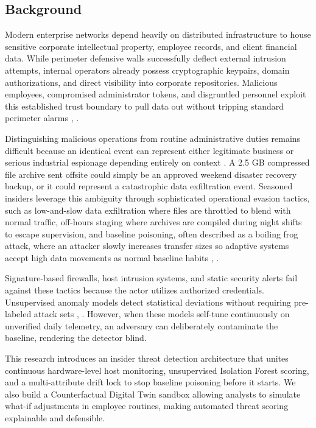 \documentclass[conference]{IEEEtran}
\begin{document}
\subsection{Background}
Modern enterprise networks depend heavily on distributed infrastructure to house sensitive corporate intellectual property, employee records, and client financial data. While perimeter defensive walls successfully deflect external intrusion attempts, internal operators already possess cryptographic keypairs, domain authorizations, and direct visibility into corporate repositories. Malicious employees, compromised administrator tokens, and disgruntled personnel exploit this established trust boundary to pull data out without tripping standard perimeter alarms \cite{b1}, \cite{b2}.

Distinguishing malicious operations from routine administrative duties remains difficult because an identical event can represent either legitimate business or serious industrial espionage depending entirely on context \cite{b3}. A 2.5 GB compressed file archive sent offsite could simply be an approved weekend disaster recovery backup, or it could represent a catastrophic data exfiltration event. Seasoned insiders leverage this ambiguity through sophisticated operational evasion tactics, such as low-and-slow data exfiltration where files are throttled to blend with normal traffic, off-hours staging where archives are compiled during night shifts to escape supervision, and baseline poisoning, often described as a boiling frog attack, where an attacker slowly increases transfer sizes so adaptive systems accept high data movements as normal baseline habits \cite{b4}, \cite{b5}.

Signature-based firewalls, host intrusion systems, and static security alerts fail against these tactics because the actor utilizes authorized credentials. Unsupervised anomaly models detect statistical deviations without requiring pre-labeled attack sets \cite{b6}, \cite{b7}. However, when these models self-tune continuously on unverified daily telemetry, an adversary can deliberately contaminate the baseline, rendering the detector blind.

This research introduces an insider threat detection architecture that unites continuous hardware-level host monitoring, unsupervised Isolation Forest scoring, and a multi-attribute drift lock to stop baseline poisoning before it starts. We also build a Counterfactual Digital Twin sandbox allowing analysts to simulate what-if adjustments in employee routines, making automated threat scoring explainable and defensible.
\end{document}
